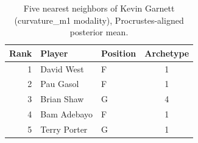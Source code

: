 \begin{table}[htbp]
  \centering\small
  \begin{tabular}{rllc}
    \toprule
    Rank & Player & Position & Archetype \\
    \midrule
    1 & David West & F & 1 \\
    2 & Pau Gasol & F & 1 \\
    3 & Brian Shaw & G & 4 \\
    4 & Bam Adebayo & F & 1 \\
    5 & Terry Porter & G & 1 \\
    \bottomrule
  \end{tabular}
  \caption{Five nearest neighbors of Kevin Garnett (curvature_m1 modality), Procrustes-aligned posterior mean.}
  \label{tab:Kevin_Garnett_neighbors_curvature_m1}
\end{table}


